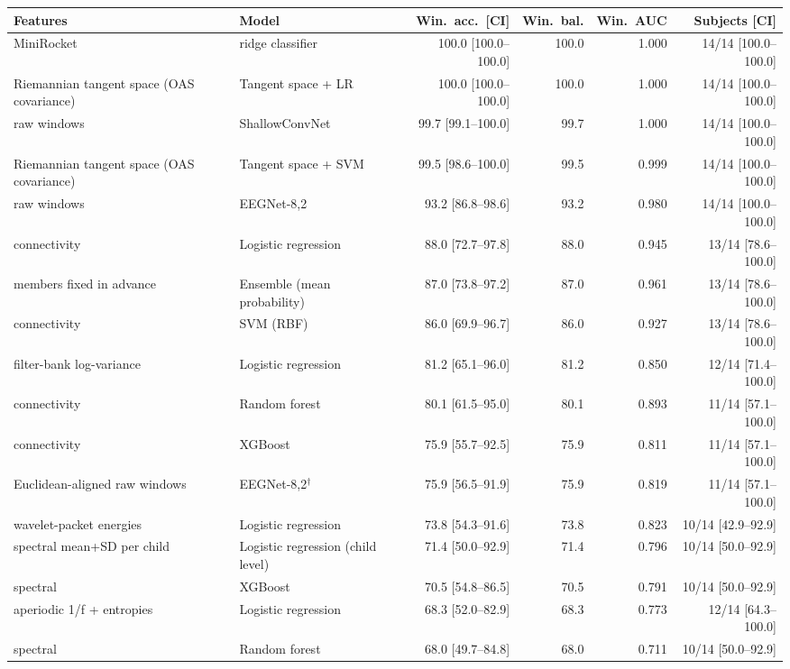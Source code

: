 \scriptsize
\begin{tabular}{llrrrr}
\hline
Features & Model & Win.\ acc.\ [CI] & Win.\ bal. & Win.\ AUC & Subjects [CI] \\
\hline
MiniRocket & ridge classifier & 100.0 [100.0--100.0] & 100.0 & 1.000 & 14/14 [100.0--100.0] \\
Riemannian tangent space (OAS covariance) & Tangent space + LR & 100.0 [100.0--100.0] & 100.0 & 1.000 & 14/14 [100.0--100.0] \\
raw windows & ShallowConvNet & 99.7 [99.1--100.0] & 99.7 & 1.000 & 14/14 [100.0--100.0] \\
Riemannian tangent space (OAS covariance) & Tangent space + SVM & 99.5 [98.6--100.0] & 99.5 & 0.999 & 14/14 [100.0--100.0] \\
raw windows & EEGNet-8,2 & 93.2 [86.8--98.6] & 93.2 & 0.980 & 14/14 [100.0--100.0] \\
connectivity & Logistic regression & 88.0 [72.7--97.8] & 88.0 & 0.945 & 13/14 [78.6--100.0] \\
members fixed in advance & Ensemble (mean probability) & 87.0 [73.8--97.2] & 87.0 & 0.961 & 13/14 [78.6--100.0] \\
connectivity & SVM (RBF) & 86.0 [69.9--96.7] & 86.0 & 0.927 & 13/14 [78.6--100.0] \\
filter-bank log-variance & Logistic regression & 81.2 [65.1--96.0] & 81.2 & 0.850 & 12/14 [71.4--100.0] \\
connectivity & Random forest & 80.1 [61.5--95.0] & 80.1 & 0.893 & 11/14 [57.1--100.0] \\
connectivity & XGBoost & 75.9 [55.7--92.5] & 75.9 & 0.811 & 11/14 [57.1--100.0] \\
Euclidean-aligned raw windows & EEGNet-8,2$^\dagger$ & 75.9 [56.5--91.9] & 75.9 & 0.819 & 11/14 [57.1--100.0] \\
wavelet-packet energies & Logistic regression & 73.8 [54.3--91.6] & 73.8 & 0.823 & 10/14 [42.9--92.9] \\
spectral mean+SD per child & Logistic regression (child level) & 71.4 [50.0--92.9] & 71.4 & 0.796 & 10/14 [50.0--92.9] \\
spectral & XGBoost & 70.5 [54.8--86.5] & 70.5 & 0.791 & 10/14 [50.0--92.9] \\
aperiodic 1/f + entropies & Logistic regression & 68.3 [52.0--82.9] & 68.3 & 0.773 & 12/14 [64.3--100.0] \\
spectral & Random forest & 68.0 [49.7--84.8] & 68.0 & 0.711 & 10/14 [50.0--92.9] \\

\end{tabular}
